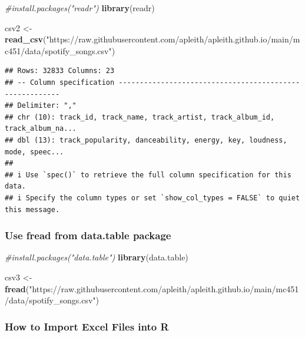 \documentclass[
  b5paper]{book}
\newenvironment{Shaded}{\begin{snugshade}}{\end{snugshade}}
\newcommand{\CommentTok}[1]{\textcolor[rgb]{0.56,0.35,0.01}{\textit{#1}}}
\newcommand{\FunctionTok}[1]{\textcolor[rgb]{0.13,0.29,0.53}{\textbf{#1}}}
\newcommand{\NormalTok}[1]{#1}
\newcommand{\OtherTok}[1]{\textcolor[rgb]{0.56,0.35,0.01}{#1}}
\newcommand{\StringTok}[1]{\textcolor[rgb]{0.31,0.60,0.02}{#1}}
\begin{document}
\begin{Shaded}
\begin{Highlighting}[]
\CommentTok{\#install.packages("readr")}
\FunctionTok{library}\NormalTok{(readr)}

\NormalTok{csv2 }\OtherTok{\textless{}{-}} \FunctionTok{read\_csv}\NormalTok{(}\StringTok{"https://raw.githubusercontent.com/apleith/apleith.github.io/main/mc451/data/spotify\_songs.csv"}\NormalTok{)}
\end{Highlighting}
\end{Shaded}

\begin{verbatim}
## Rows: 32833 Columns: 23
## -- Column specification --------------------------------------------------------
## Delimiter: ","
## chr (10): track_id, track_name, track_artist, track_album_id, track_album_na...
## dbl (13): track_popularity, danceability, energy, key, loudness, mode, speec...
## 
## i Use `spec()` to retrieve the full column specification for this data.
## i Specify the column types or set `show_col_types = FALSE` to quiet this message.
\end{verbatim}

\hypertarget{use-fread-from-data.table-package}{%
\subsubsection*{Use fread from data.table package}\label{use-fread-from-data.table-package}}

\begin{Shaded}
\begin{Highlighting}[]
\CommentTok{\#install.packages("data.table")}
\FunctionTok{library}\NormalTok{(data.table)}

\NormalTok{csv3 }\OtherTok{\textless{}{-}} \FunctionTok{fread}\NormalTok{(}\StringTok{"https://raw.githubusercontent.com/apleith/apleith.github.io/main/mc451/data/spotify\_songs.csv"}\NormalTok{)}
\end{Highlighting}
\end{Shaded}

\hypertarget{how-to-import-excel-files-into-r}{%
\subsubsection*{How to Import Excel Files into R}\label{how-to-import-excel-files-into-r}}
\end{document}
